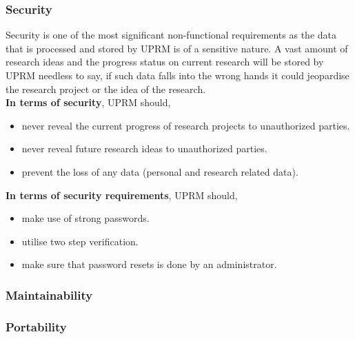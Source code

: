 \subsubsection{Security}
Security is one of the most significant non-functional requirements as the data that is processed and stored by UPRM is of a sensitive nature. 
A vast amount of research ideas and the progress status on current research will be stored by UPRM needless to say, if such data falls into the wrong hands it could jeopardise the research project or the idea of the research.\\ 

\textbf{In terms of security}, UPRM should,
	\begin{itemize} 
		\item never reveal the current progress of research projects to unauthorized parties.
		\item never reveal future research ideas to unauthorized parties.
		\item prevent the loss of any data (personal and research related data).
	\end{itemize}

\textbf{In terms of security requirements}, UPRM should,
	\begin{itemize} 
		\item make use of strong passwords.
		\item utilise two step verification.
		\item make sure that password resets is done by an administrator.
	\end{itemize}

\subsubsection{Maintainability}

\subsubsection{Portability}